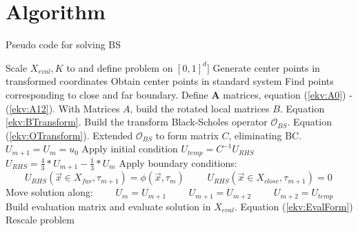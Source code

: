 \documentclass[a4paper]{article}      %
\begin{document}
\section*{Algorithm}
\begin{algorithm}[H]
    \centering
    \caption{Pseudo code for solving BS}
    \begin{algorithmic}[1]
    		\State Scale ${X}_{eval}, K$ to and define problem on $[0, 1]^d]$
    		\State Generate center points in transformed coordinates
    		\State Obtain center points in standard system
    		\State Find points corresponding to close and far boundary. 
		\State Define $\mathbf{A}$ matrices, equation (\ref{ekv:A0}) - (\ref{ekv:A12}).     
        \State With Matrices $A$, build the rotated local matrices $B$. Equation \ref{ekv:BTransform}.
        \State Build the transform Black-Scholes operator $\mathcal{O}_{BS}$. Equation (\ref{ekv:OTransform}).
        \State Extended $\mathcal{O}_{BS}$ to form matrix $C$, eliminating BC. $U_{m+1} = U_{m} = u_0$
        \State Apply initial condition 
        \State $U_{temp} = C^{-1}U_{RHS}$
        \State $U_{RHS} = \frac{4}{3}*U_{m+1} - \frac{1}{3}*U_{m}$
        \State Apply boundary conditions: 
        \State $\qquad U_{RHS}(\vec{x}\in X_{far}, \tau_{m+1}) = \phi(\vec{x}, \tau_m)$
        \State $\qquad U_{RHS}(\vec{x}\in X_{close}, \tau_{m+1}) = 0$
        \State Move solution along:
        \State $\qquad U_{m} = U_{m+1}$
        \State $\qquad U_{m+1} = U_{m+2}$
        \State $\qquad U_{m+2} = U_{temp}$
        \EndFor
    \State Build evaluation matrix and evaluate solution in $X_{eval}$. Equation (\ref{ekv:EvalForm})
    \State Rescale problem
    \end{algorithmic}
        \label{alg:1}
\end{algorithm}
\end{document}
